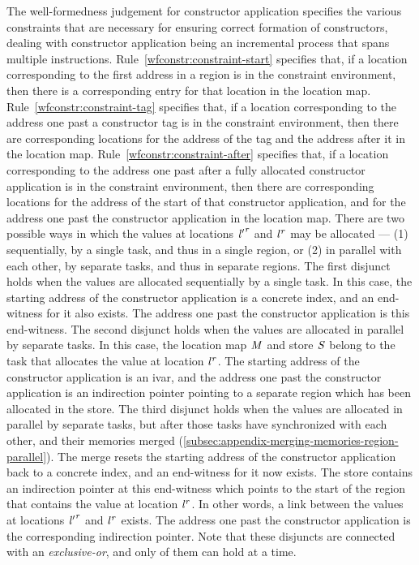 The well-formedness judgement for constructor application specifies the various constraints
that are necessary for ensuring correct formation of constructors, dealing with constructor
application being an incremental process that spans multiple \ourcalc{} instructions.
%
Rule~\ref{wfconstr:constraint-start} specifies that, if a location corresponding to the
first address in a region is in the constraint environment, then there is a corresponding
entry for that location in the location map.
%
Rule~\ref{wfconstr:constraint-tag} specifies that, if a location corresponding to the address one past a constructor
tag is in the constraint environment, then there are corresponding locations for the address
of the tag and the address after it in the location map.
%
Rule~\ref{wfconstr:constraint-after} specifies that, if a location corresponding to the address
one past after a fully allocated constructor application is in the constraint environment,
then there are corresponding locations
for the address of the start of that constructor application, and
for the address one past the constructor application in the location map.
%
There are two possible ways in which the values at locations ${\mathit{l}'}^{\mathit{r}}$
and ${\mathit{l}}^{\mathit{r}}$ may be allocated ---
(1) sequentially, by a single task, and thus in a single region, or
(2) in parallel with each other, by separate tasks, and thus in separate regions.
%
The first disjunct holds when the values are allocated sequentially by a single task.
%
In this case, the starting address of the constructor application is a concrete index,
and an end-witness for it also exists.
%
The address one past the constructor application is this end-witness.
%
The second disjunct holds when the values are allocated in parallel by separate tasks.
%
In this case, the location map $\mathit{M}$ and store $\mathit{S}$ belong to the task
that allocates the value at location ${\mathit{l}}^{\mathit{r}}$.
%
The starting address of the constructor application is an ivar,
and the address one past the constructor application is an indirection pointer
pointing to a separate region which has been allocated in the store.
%
The third disjunct holds when the values are allocated in parallel by separate tasks,
but after those tasks have synchronized with each other, and their memories merged
(\ref{subsec:appendix-merging-memories-region-parallel}).
%
The merge resets the starting address of the constructor application back to
a concrete index, and an end-witness for it now exists.
%
The store contains an indirection pointer at this end-witness which points
to the start of the region that contains the value at location ${\mathit{l}}^{\mathit{r}}$.
%
In other words, a link between the values at locations ${\mathit{l}'}^{\mathit{r}}$ and
${\mathit{l}}^{\mathit{r}}$ exists.
%
The address one past the constructor application is the corresponding indirection pointer.
%
Note that these disjuncts are connected with an {\em exclusive-or}, and only of them
can hold at a time.


